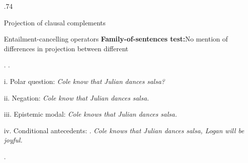 \documentclass[final, table, cmyk]{beamer}
\newlength{\colwidth}
\newlength{\vboxsep}
\begin{document}
\begin{frame}[t]
\begin{columns}[t]
\begin{column}{.74\colwidth}
\begin{normalbox}{Projection of clausal complements}
{\begin{minipage}{1.7\linewidth}
					\end{minipage}
				}
			\end{normalbox}

			\vspace{\vboxsep}
			\begin{normalbox}{Entailment-cancelling operators}
				\textbf{Family-of-sentences test:}\newline No mention of differences in projection between different 
				
				\ex. \phantom.\vspace{-2.8\baselineskip}\newline
					\begin{questionbox}{i. Polar question:}
						\hfill \textit{ Cole know that Julian dances salsa?}
					\end{questionbox}
					\vspace{-.8\baselineskip}
					\begin{negbox}{ii. Negation:} \hfill \textit{Cole  know that Julian dances salsa.}
					\end{negbox}
					\vspace{-.8\baselineskip}
					\begin{modalbox}{iii. Epistemic modal:}
						\hfill \textit{ Cole knows that Julian dances salsa.}
					\end{modalbox}
					\vspace{-.8\baselineskip}
					\begin{condbox}{iv. Conditional antecedents:}\newline
						\phantom.\hfill\textit{ Cole knows that Julian dances salsa, Logan will be joyful.}
					\end{condbox}
				\z.

				\vspace{-.5\baselineskip}

			\end{normalbox}


\end{column}
\end{columns}
\end{frame}
\end{document}
